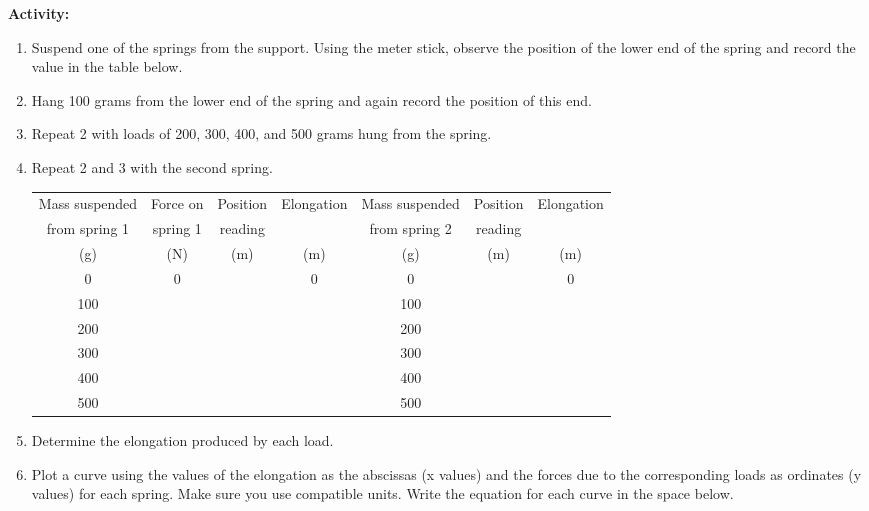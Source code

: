 {\noindent \bf Activity:} \begin{enumerate}



\item  Suspend one of the springs from the support. Using the meter stick, observe the position of the lower end of the spring and record the value in the table below.

\item  Hang 100 grams from the lower end of the spring and again record the position of this end.

\item  Repeat 2 with loads of 200, 300, 400, and 500 grams hung from the spring.

\item  Repeat 2 and 3 with the second spring.

\begin{center} \begin{tabular}{||c|c|c|c||c|c|c||} \hline \hline Mass suspended & Force on & Position & Elongation & Mass suspended & Position & Elongation \\ from spring 1 & spring 1 & reading & & from spring 2 & reading & \\ (g) & (N) & (m) & (m) & (g) & (m) & (m) \\ \hline \hline 0 & 0 & & 0 & 0 & & 0 \\ \hline 100 & & & & 100 & & \\ \hline 200 & & & & 200 & & \\ \hline 300 & & & & 300 & & \\ \hline 400 & & & & 400 & & \\ \hline 500 & & & & 500 & & \\ \hline \hline \end{tabular} \end{center}

\item Determine the elongation produced by each load.

\item  Plot a curve using the values of the elongation as the abscissas (x values) and the forces due to the corresponding loads as ordinates (y values) for each spring. Make sure you use compatible units. Write the equation for each curve in the space below.

\vskip70pt

\end{enumerate}

